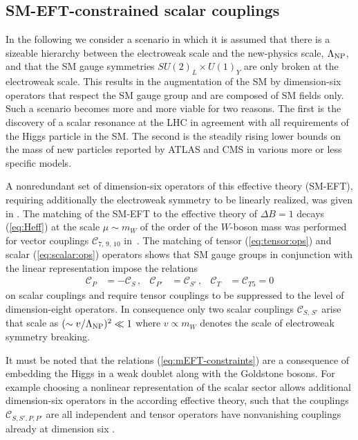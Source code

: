 \documentclass[twocolumn,epjc3]{svjour3}
\numberwithin{equation}{section}
\def \refeq#1{(\ref{#1})}
\newcommand{\wilson}[2][{}]{\mathcal{C}_{#2}^{\mathrm{#1}}}
\renewcommand{\[}{\big[}
\renewcommand{\]}{\big]}
\renewcommand{\(}{\big(}
\renewcommand{\)}{\big)}
\begin{document}
\subsection{SM-EFT-constrained scalar couplings \label{sec:SM-EFT}}

In the following we consider a scenario in which it is assumed that there is
a sizeable hierarchy between the electroweak scale and the new-physics 
scale, $\Lambda_{\rm NP}$, and that the SM gauge symmetries $SU(2)_L \times
U(1)_Y$ are only broken at the electroweak scale. This results in the
augmentation of the SM by dimension-six operators that respect the SM gauge
group and are composed of SM fields only. Such a scenario becomes more
and more viable for two reasons. The first is the discovery of a
scalar resonance at the LHC in agreement with all requirements of the
Higgs particle in the SM. The second is the steadily rising lower
bounds on the mass of new particles reported by ATLAS and CMS in
various more or less specific models.

A nonredundant set of dimension-six operators of this effective theory (SM-EFT),
requiring additionally the electroweak symmetry to be linearly realized,
was given in \cite{Grzadkowski:2010es}.  The matching of the SM-EFT to the
effective theory of $\Delta B = 1$ decays \refeq{eq:Heff} at the scale
$\mu \sim m_W$ of the order of the $W$-boson mass was performed for vector
couplings $\wilson{7,\,9,\,10}$ in~\cite{D'Ambrosio:2002ex}. The matching
of tensor \refeq{eq:tensor:ops} and scalar \refeq{eq:scalar:ops} operators 
\cite{Alonso:2014csa} shows that SM gauge groups in conjunction with the 
linear representation impose the relations
\begin{align}
  \label{eq:mEFT-constraints}
  \wilson{P}  & = -\wilson{S}\,, &
  \wilson{P'} & = \wilson{S'}\,, &
  \wilson{T}  & = \wilson{T5} = 0
\end{align}
on scalar couplings and require tensor couplings to be
suppressed to the level of dimension-eight operators. In consequence only two
scalar couplings $\wilson{S,\, S'}$ arise that scale as $(\sim v/\Lambda_{\rm
  NP})^2 \ll 1$ where $v \propto m_W$ denotes the scale of electroweak symmetry breaking.

It must be noted that the relations \refeq{eq:mEFT-constraints} are a
consequence of embedding the Higgs in a weak doublet along with the Goldstone
bosons.  For example choosing a nonlinear representation of the scalar sector
allows additional dimension-six operators in the according effective theory, 
such that the couplings $\wilson{S,S',P,P'}$ are all independent and tensor
operators have nonvanishing couplings already at dimension six 
\cite{Cata:2015lta}.
\end{document}
